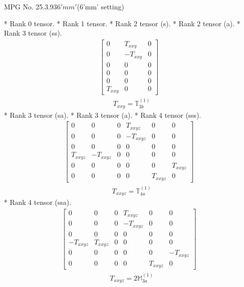 \documentclass[fleqn,8pt,landscape]{jsarticle}
\begin{document}
\setcounter{MaxMatrixCols}{32}

\renewcommand{\tablename}{Table~}
\renewcommand{\figurename}{Figure~}
\begin{center}
\LARGE
MPG No. 25.3.93\quad$6'mm'$\quad(6'mm' setting)
\end{center}
* Rank 0 tensor.
* Rank 1 tensor.
* Rank 2 tensor (s).
* Rank 2 tensor (a).
* Rank 3 tensor (ss).
\begin{align*}
\begin{bmatrix} 0 & T_{xxy} & 0 \\ 0 & - T_{xxy} & 0 \\ 0 & 0 & 0 \\ 0 & 0 & 0 \\ 0 & 0 & 0 \\ T_{xxy} & 0 & 0 \end{bmatrix}
\end{align*}
\begin{align*}
& T_{xxy} = \mathbb{T}_{3b}^{(1)}
\end{align*}
* Rank 3 tensor (sa).
* Rank 3 tensor (a).
* Rank 4 tensor (sss).
\begin{align*}
\begin{bmatrix} 0 & 0 & 0 & T_{xxyz} & 0 & 0 \\ 0 & 0 & 0 & - T_{xxyz} & 0 & 0 \\ 0 & 0 & 0 & 0 & 0 & 0 \\ T_{xxyz} & - T_{xxyz} & 0 & 0 & 0 & 0 \\ 0 & 0 & 0 & 0 & 0 & T_{xxyz} \\ 0 & 0 & 0 & 0 & T_{xxyz} & 0 \end{bmatrix}
\end{align*}
\begin{align*}
& T_{xxyz} = \mathbb{T}_{4a}^{(1)}
\end{align*}
* Rank 4 tensor (ssa).
\begin{align*}
\begin{bmatrix} 0 & 0 & 0 & T_{xxyz} & 0 & 0 \\ 0 & 0 & 0 & - T_{xxyz} & 0 & 0 \\ 0 & 0 & 0 & 0 & 0 & 0 \\ - T_{xxyz} & T_{xxyz} & 0 & 0 & 0 & 0 \\ 0 & 0 & 0 & 0 & 0 & - T_{xxyz} \\ 0 & 0 & 0 & 0 & T_{xxyz} & 0 \end{bmatrix}
\end{align*}
\begin{align*}
& T_{xxyz} = 2 \mathbb{M}_{3a}^{(1)}
\end{align*}
\end{document}
